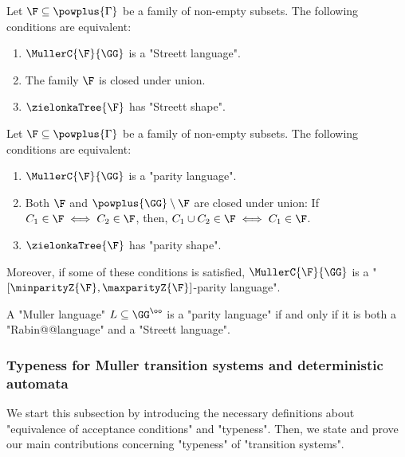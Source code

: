\documentclass[10pt,a4paper]{amsart}
\begin{document}
\begin{proposition}\label{prop-typ:StreettZielonkaShape}
	Let $\F\subseteq \powplus{\Gamma}$ be a family of non-empty subsets. The following conditions are equivalent:
	\begin{enumerate}
		\item $\MullerC{\F}{\GG}$ is a "Streett language".
		\item The family $\F$ is closed under union.
		\item $\zielonkaTree{\F}$ has "Streett shape". 
	\end{enumerate}
	
\end{proposition}

\begin{proposition}\label{prop-typ:parityZielonkaShape}
	Let $\F\subseteq \powplus{\Gamma}$ be a family of non-empty subsets. The following conditions are equivalent:
	\begin{enumerate}
		\item $\MullerC{\F}{\GG}$ is a "parity language".
		\item Both $\F$ and $\powplus{\GG}\setminus \F$ are closed under union: If %
		$C_1\in \F \iff C_2\in \F$, then, $C_1\cup C_2\in \F \iff C_1\in \F$.
		\item $\zielonkaTree{\F}$ has "parity shape". 
	\end{enumerate}
	Moreover, if some of these conditions is satisfied, $\MullerC{\F}{\GG}$ is a "$[\minparityZ{\F},\maxparityZ{\F}]$-parity language".
\end{proposition}

\begin{corollary}
	A "Muller language" $L \subseteq \GG^\oo$ is a "parity language" if and only if it is both a "Rabin@@language" and  a "Streett language".
\end{corollary}




\subsubsection{Typeness for  Muller transition systems and deterministic automata}\label{subsubsec-typeness:Typeness_TS}
We start this subsection by introducing the necessary definitions about "equivalence of acceptance conditions" and "typeness". Then, we state and prove our main contributions concerning "typeness" of "transition systems".
\end{document}
